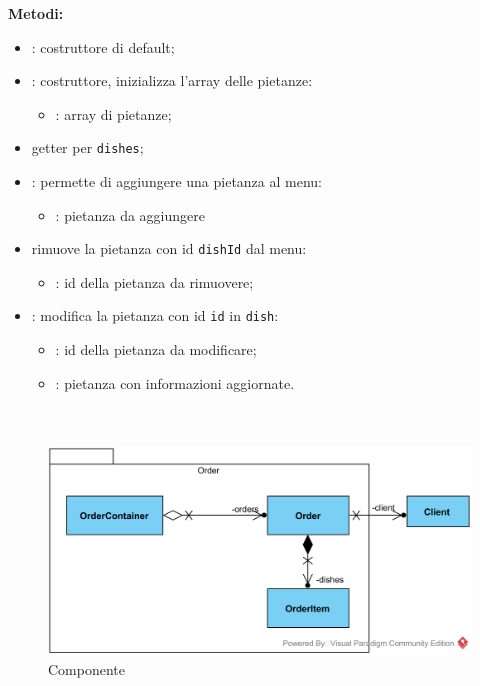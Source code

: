\textbf{Metodi:}
\begin{itemize}
	\item {}: costruttore di default;
	\item {}: costruttore, inizializza l'array delle pietanze:
	\begin{itemize}
		\item {}: array di pietanze;
	\end{itemize}
	\item {} getter per \texttt{dishes};
	\item {}: permette di aggiungere una pietanza al menu:
	\begin{itemize}
		\item {}: pietanza da aggiungere
	\end{itemize}
	\item {} rimuove la pietanza con id \texttt{dishId} dal menu:
	\begin{itemize}
		\item {}: id della pietanza da rimuovere;
	\end{itemize}
	\item {}: modifica la pietanza con id \texttt{id} in \texttt{dish}:
	\begin{itemize}
		\item {}: id della pietanza da modificare;
		\item {}: pietanza con informazioni aggiornate.
	\end{itemize}
\end{itemize}

\paragraph[::Order]{\class}\mbox{}\\ \label{\class}
\begin{figure}[H]
	\centering
	\includegraphics[width=12cm]{./diagrammi/demo/server/orderpkg.png}
	\caption{Componente \class}
\end{figure}

